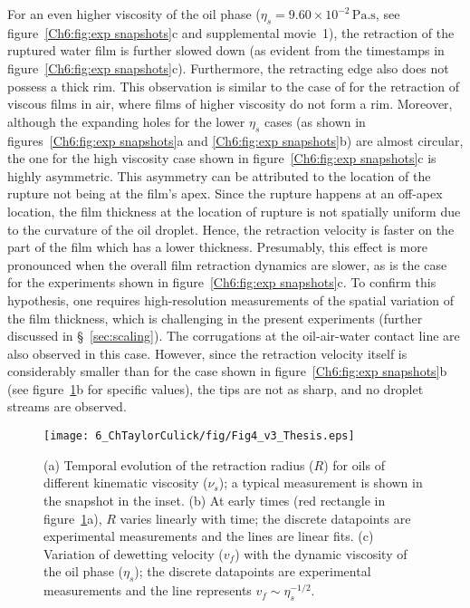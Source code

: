 For an even higher viscosity of the oil phase ($\eta_{s} = 9.60 \times 10^{-2}\,\si{\pascal}.\si{\second}$, see figure~\ref{Ch6:fig:exp snapshots}c and supplemental movie~{\color{Myfig}1}), the retraction of the ruptured water film is further slowed down (as evident from the timestamps in figure~\ref{Ch6:fig:exp snapshots}c). Furthermore, the retracting edge also does not possess a thick rim. This observation is similar to the case of \citet{brenner-1999-pof} for the retraction of viscous films in air, where films of higher viscosity do not form a rim. Moreover, although the expanding holes for the lower $\eta_{s}$ cases (as shown in figures~\ref{Ch6:fig:exp snapshots}a and \ref{Ch6:fig:exp snapshots}b) are almost circular, the one for the high viscosity case shown in figure~\ref{Ch6:fig:exp snapshots}c is highly asymmetric. This asymmetry can be attributed to the location of the rupture not being at the film's apex. Since the rupture happens at an off-apex location, the film thickness at the location of rupture is not spatially uniform due to the curvature of the oil droplet. Hence, the retraction velocity is faster on the part of the film which has a lower thickness. Presumably, this effect is more pronounced when the overall film retraction dynamics are slower, as is the case for the experiments shown in figure~\ref{Ch6:fig:exp snapshots}c. To confirm this hypothesis, one requires high-resolution measurements of the spatial variation of the film thickness, which is challenging in the present experiments (further discussed in \S~\ref{sec:scaling}). The corrugations at the oil-air-water contact line are also observed in this case. However, since the retraction velocity itself is considerably smaller than for the case shown in figure~\ref{Ch6:fig:exp snapshots}b (see figure~\ref{Ch6:fig:dynamics}b for specific values), the tips are not as sharp, and no droplet streams are observed. 

\begin{figure}
	\centering
	\texttt{[image: 6\_ChTaylorCulick/fig/Fig4\_v3\_Thesis.eps]}
	\caption{(a) Temporal evolution of the retraction radius ($R$) for oils of different kinematic viscosity ($\nu_{s}$); a typical measurement is shown in the snapshot in the inset. (b) At early times (red rectangle in figure~\ref{Ch6:fig:dynamics}a), $R$ varies linearly with time; the discrete datapoints are experimental measurements and the lines are linear fits. (c) Variation of dewetting velocity ($v_f$) with the dynamic viscosity of the oil phase ($\eta_{s}$); the discrete datapoints are experimental measurements and the line represents $v_f \sim \eta_{s}^{-1/2}$.}
	\label{Ch6:fig:dynamics}
\end{figure}

